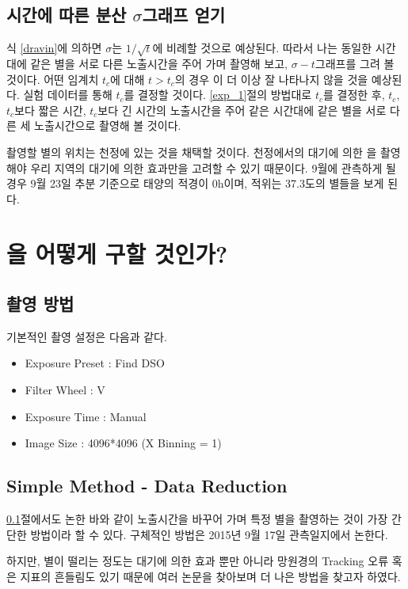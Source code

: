 \documentclass[12pt]{article}
\begin{document}
\subsection{시간에 따른 \scin 분산 $\sigma$그래프 얻기} \label{sigma-t}

식 \ref{dravin}에 의하면 $\sigma$는 $1/\sqrt{t}$에 비례할 것으로 예상된다. 따라서 나는 동일한 시간대에 같은 별을 서로 다른 노출시간을 주어 가며 촬영해 보고, $\sigma - t$그래프를 그려 볼 것이다.
어떤 임계치 $t_c$에 대해 $t>t_c$의 경우 \scin 이 더 이상 잘 나타나지 않을 것을 예상된다. 실험 데이터를 통해 $t_c$를 결정할 것이다.
\ref{exp_1}절의 방법대로 $t_c$를 결정한 후, $t_c$, $t_c$보다 짧은 시간, $t_c$보다 긴 시간의 노출시간을 주어 같은 시간대에 같은 별을 서로 다른 세 노출시간으로 촬영해 볼 것이다.

촬영할 별의 위치는 천정에 있는 것을 채택할 것이다. 천정에서의 대기에 의한 \scin 을 촬영해야 우리 지역의 대기에 의한 효과만을 고려할 수 있기 때문이다.
9월에 관측하게 될 경우 9월 23일 추분 기준으로 태양의 적경이 0h이며, 적위는 37.3도의 별들을 보게 된다.

\section{\scin 을 어떻게 구할 것인가?}

\subsection{촬영 방법}
기본적인 촬영 설정은 다음과 같다.
\begin{itemize}
	\item Exposure Preset : Find DSO 
	\item Filter Wheel : V
	\item Exposure Time : Manual
	\item Image Size : 4096*4096 (X Binning = 1)
\end{itemize}

\subsection{Simple Method - Data Reduction} \label{simple_reduction}

\ref{sigma-t}절에서도 논한 바와 같이 노출시간을 바꾸어 가며 특정 별을 촬영하는 것이 가장 간단한 방법이라 할 수 있다. 구체적인 방법은 2015년 9월 17일 관측일지에서 논한다.

하지만, 별이 떨리는 정도는 대기에 의한 효과 뿐만 아니라 망원경의 Tracking 오류 혹은 지표의 흔들림도 있기 때문에 여러 논문을 찾아보며 더 나은 방법을 찾고자 하였다.
\end{document}
